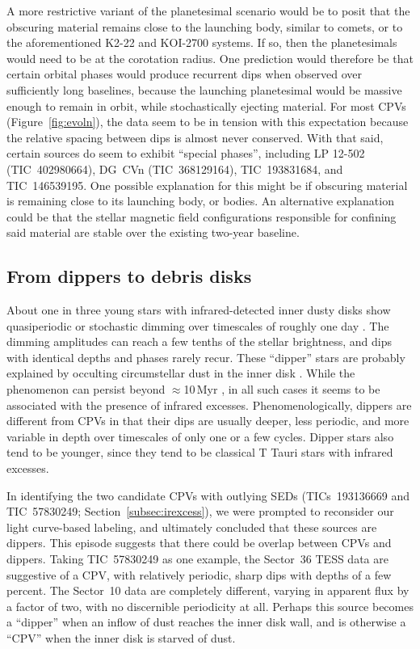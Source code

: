 \documentclass[11pt,twocolumn,tighten]{aastex63}
\begin{document}
A more restrictive variant of the planetesimal scenario would be to
posit that the obscuring material remains close to the launching body,
similar to comets, or to the aforementioned K2-22 and KOI-2700
systems.  If so, then the planetesimals would need to be at the
corotation radius.  One prediction would therefore be that certain
orbital phases would produce recurrent dips when observed over
sufficiently long baselines, because the launching planetesimal would
be massive enough to remain in orbit, while stochastically ejecting
material.  For most CPVs (Figure~\ref{fig:evoln}), the data seem to be
in tension with this expectation because the relative spacing between
dips is almost never conserved.  With that said, certain sources do
seem to exhibit ``special phases'', including LP 12-502
(TIC~402980664), DG~CVn (TIC~368129164), TIC~193831684, and
TIC~146539195.  One possible explanation for this might be if
obscuring material is remaining close to its launching body, or
bodies.  An alternative explanation could be that the stellar magnetic
field configurations responsible for confining said material are
stable over the existing two-year baseline.



\subsection{From dippers to debris disks}
\label{subsec:discdippers}

About one in three young stars with infrared-detected inner dusty
disks show quasiperiodic or stochastic dimming over timescales of
roughly one day \citep[e.g.][]{2010A&A...519A..88A}.  The dimming
amplitudes can reach a few tenths of the stellar brightness, and dips
with identical depths and phases rarely recur.  These ``dipper'' stars
are probably explained by occulting circumstellar dust in the inner
disk
\citep[e.g.][]{2014AJ....147...82C,2016ApJ...816...69A,2021ApJ...908...16R,2022ApJS..263...14C}.
While the phenomenon can persist beyond $\approx$10\,Myr
\citep{2019MNRAS.488.4465G,2022MNRAS.514.1386G}, in all such cases it
seems to be associated with the presence of infrared excesses.
Phenomenologically, dippers are different from CPVs in that their dips
are usually deeper, less periodic, and more variable in depth over
timescales of only one or a few cycles.  Dipper stars also tend to be
younger, since they tend to be classical T Tauri stars with infrared
excesses.

In identifying the two candidate CPVs with outlying SEDs
(TICs~193136669 and TIC~57830249; Section~\ref{subsec:irexcess}), we
were prompted to reconsider our light curve-based labeling, and
ultimately concluded that these sources are dippers.  This episode
suggests that there could be overlap between CPVs and dippers.  Taking
TIC~57830249 as one example, the Sector~36 TESS data are suggestive of
a CPV, with relatively periodic, sharp dips with depths of a few
percent.  The Sector~10 data are completely different, varying in
apparent flux by a factor of two, with no discernible periodicity at
all.  Perhaps this source becomes a ``dipper'' when an inflow of dust
reaches the inner disk wall, and is otherwise a ``CPV'' when the inner
disk is starved of dust.
\end{document}
